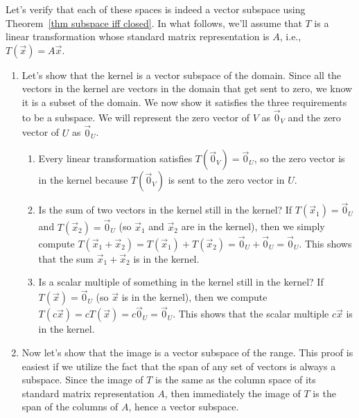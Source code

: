 \begin{example}\label{verification of key subspaces}
Let's verify that each of these spaces is indeed a vector subspace using Theorem~\ref{thm subspace iff closed}. In what follows, we'll assume that $T$ is a linear transformation whose standard matrix representation is $A$, i.e., $T(\vec x)=A\vec x$. 
\begin{enumerate}
	\item Let's show that the kernel is a vector subspace of the domain. Since all the vectors in the kernel are vectors in the domain that get sent to zero, we know it is a subset of the domain.  We now show it satisfies the three requirements to be a subspace.  We will represent the zero vector of $V$ as $\vec 0_V$ and the zero vector of $U$ as $\vec 0_U$.
\begin{enumerate}
	\item Every linear transformation satisfies $T(\vec 0_V)=\vec 0_U$, so the zero vector is in the kernel because $T(\vec 0_V)$ is sent to the zero vector in $U$.  
	\item Is the sum of two vectors in the kernel still in the kernel? If $T(\vec x_1)=\vec 0_U$ and $T(\vec x_2)=\vec 0_U$ (so $\vec x_1$ and $\vec x_2$ are in the kernel), then we simply compute $T(\vec x_1+\vec x_2)=T(\vec x_1)+T(\vec x_2)=\vec 0_U+\vec 0_U=\vec 0_U$. This shows that the sum $\vec x_1+\vec x_2$ is in the kernel. 
	\item Is a scalar multiple of something in the kernel still in the kernel? If $T(\vec x)=\vec 0_U$ (so $\vec x$ is in the kernel), then we compute $T(c\vec x)=cT(\vec x)=c\vec 0_U=\vec 0_U$. This shows that the scalar multiple $c\vec x$ is in the kernel. 
\end{enumerate}

	\item Now let's show that the image is a vector subspace of the range. This proof is easiest if we utilize the fact that the span of any set of vectors is always a subspace.  Since the image of $T$ is the same as the column space of its standard matrix representation $A$, then immediately the image of $T$ is the span of the columns of $A$, hence a vector subspace.
	

\end{enumerate}
\end{example}
